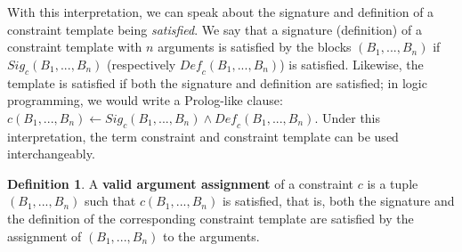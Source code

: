 \documentclass{IEEEtran}
\newcommand{\samuel}[1]{\textcolor{green}{{\sc Samuel:} #1}\xspace}
\newcommand{\tias}[1]{\textcolor{blue}{{\sc Tias:} #1}\xspace}
\newcommand{\format}[1]{\textit{#1}\xspace}
\newcommand{\range}[3]{\ensuremath{#1[#2,#3]}}
\newcommand{\rangeall}{:}
\theoremstyle{definition}
\newtheorem{definition}{Definition}
\begin{document}
\newcommand{\sigc}{\ensuremath{\format{Sig}_c}}
\newcommand{\defc}{\ensuremath{\format{Def}_c}}
With this interpretation, we can speak about the signature and definition of a constraint template being \textit{satisfied}. We say that a signature (definition) of a constraint template with $n$ arguments is satisfied by the blocks $(B_1, ..., B_n)$ if $\sigc(B_1, ..., B_n)$ (respectively $\defc(B_1, ..., B_n)$) is satisfied. Likewise, the template is satisfied if both the signature and definition are satisfied; in logic programming, we would write a Prolog-like clause: $c(B_1, ..., B_n) \leftarrow \sigc(B_1, ..., B_n) \wedge \defc(B_1, ..., B_n)$. Under this interpretation, the term constraint and constraint template can be used interchangeably.

\begin{definition}
A \textbf{valid argument assignment} of a constraint $c$ is a tuple $(B_1, ..., B_n)$ such that $c(B_1, ..., B_n)$ is satisfied, that is, both the signature and the definition of the corresponding constraint template are satisfied by the assignment of $(B_1, ..., B_n)$ to the arguments.
\end{definition}

\end{document}
